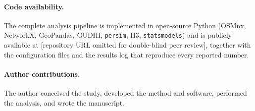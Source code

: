 \paragraph{Code availability.} The complete analysis pipeline is implemented in
open-source Python (OSMnx, NetworkX, GeoPandas, GUDHI, \texttt{persim}, H3,
\texttt{statsmodels}) and is publicly available at
[repository URL omitted for double-blind peer review], together with the
configuration files and the results log that reproduce every reported number.

\paragraph{Author contributions.} The author conceived
the study, developed the method and software, performed the analysis, and wrote
the manuscript.
